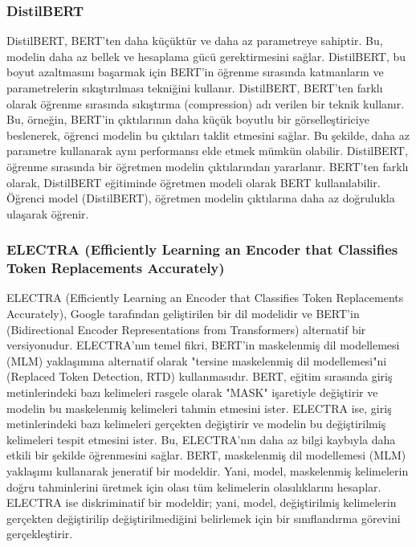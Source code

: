 \subsubsection{DistilBERT}
DistilBERT, BERT'ten daha küçüktür ve daha az parametreye sahiptir. Bu, modelin daha az bellek ve hesaplama gücü gerektirmesini sağlar. DistilBERT, bu boyut azaltmasını başarmak için BERT'in öğrenme sırasında katmanların ve parametrelerin sıkıştırılması tekniğini kullanır. DistilBERT, BERT'ten farklı olarak öğrenme sırasında sıkıştırma (compression) adı verilen bir teknik kullanır. Bu, örneğin, BERT'in çıktılarının daha küçük boyutlu bir görselleştiriciye beslenerek, öğrenci modelin bu çıktıları taklit etmesini sağlar. Bu şekilde, daha az parametre kullanarak aynı performansı elde etmek mümkün olabilir. DistilBERT, öğrenme sırasında bir öğretmen modelin çıktılarından yararlanır. BERT'ten farklı olarak, DistilBERT eğitiminde öğretmen modeli olarak BERT kullanılabilir. Öğrenci model (DistilBERT), öğretmen modelin çıktılarına daha az doğrulukla ulaşarak öğrenir.

\subsubsection{ELECTRA (Efficiently Learning an Encoder that Classifies Token Replacements Accurately)}
ELECTRA (Efficiently Learning an Encoder that Classifies Token Replacements Accurately), Google tarafından geliştirilen bir dil modelidir ve BERT'in (Bidirectional Encoder Representations from Transformers) alternatif bir versiyonudur. ELECTRA'nın temel fikri, BERT'in maskelenmiş dil modellemesi (MLM) yaklaşımına alternatif olarak "tersine maskelenmiş dil modellemesi"ni (Replaced Token Detection, RTD) kullanmasıdır. BERT, eğitim sırasında giriş metinlerindeki bazı kelimeleri rasgele olarak "MASK" işaretiyle değiştirir ve modelin bu maskelenmiş kelimeleri tahmin etmesini ister. ELECTRA ise, giriş metinlerindeki bazı kelimeleri gerçekten değiştirir ve modelin bu değiştirilmiş kelimeleri tespit etmesini ister. Bu, ELECTRA'nın daha az bilgi kaybıyla daha etkili bir şekilde öğrenmesini sağlar. BERT, maskelenmiş dil modellemesi (MLM) yaklaşımı kullanarak jeneratif bir modeldir. Yani, model, maskelenmiş kelimelerin doğru tahminlerini üretmek için olası tüm kelimelerin olasılıklarını hesaplar. ELECTRA ise diskriminatif bir modeldir; yani, model, değiştirilmiş kelimelerin gerçekten değiştirilip değiştirilmediğini belirlemek için bir sınıflandırma görevini gerçekleştirir.

